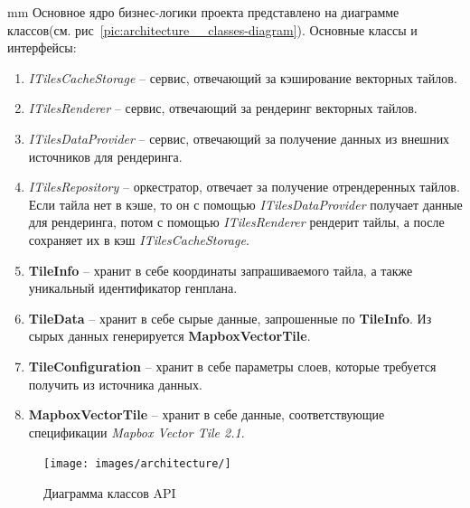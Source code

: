  mm
Основное ядро бизнес-логики проекта представлено на диаграмме классов(см. рис\ \ref{pic:architecture__classes-diagram}).
Основные классы и интерфейсы:
\begin{enumerate}
	\item \textit{ITilesCacheStorage} -- сервис, отвечающий за кэширование векторных тайлов.
	\item \textit{ITilesRenderer} -- сервис, отвечающий за рендеринг векторных тайлов.
	\item \textit{ITilesDataProvider} -- сервис, отвечающий за получение данных из внешних источников для рендеринга.
	\item \textit{ITilesRepository} -- оркестратор, отвечает за получение отрендеренных тайлов.
	Если тайла нет в кэше, то он с помощью \textit{ITilesDataProvider} получает данные для рендеринга, потом
	с помощью \textit{ITilesRenderer} рендерит тайлы, а после сохраняет их в кэш \textit{ITilesCacheStorage}.
	\item \textbf{TileInfo} -- хранит в себе координаты запрашиваемого тайла, а также уникальный идентификатор генплана.
	\item \textbf{TileData} -- хранит в себе сырые данные, запрошенные по \textbf{TileInfo}.
	Из сырых данных генерируется \textbf{MapboxVectorTile}.
	\item \textbf{TileConfiguration} -- хранит в себе параметры слоев, которые требуется получить из источника данных.
	\item \textbf{MapboxVectorTile} -- хранит в себе данные, соответствующие спецификации \textit{Mapbox Vector Tile 2.1}.
\end{enumerate}


\begin{figure}[H]
	\hspace*{-2.5 cm}\texttt{[image: images/architecture/]}
	\caption{Диаграмма классов API}
	\label{pic:architecture__api-classes-diagram}
\end{figure}
